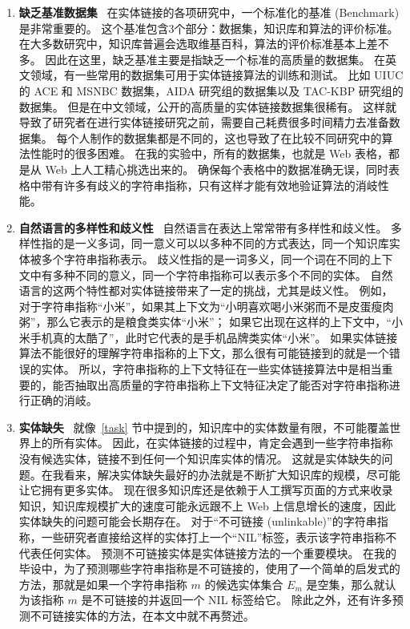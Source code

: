 \begin{enumerate}[1.]
\item \textbf{缺乏基准数据集} \ 
在实体链接的各项研究中，一个标准化的基准 (Benchmark) 是非常重要的。
这个基准包含3个部分：数据集，知识库和算法的评价标准。
在大多数研究中，知识库普遍会选取维基百科，算法的评价标准基本上差不多。
因此在这里，缺乏基准主要是指缺乏一个标准的高质量的数据集。
在英文领域，有一些常用的数据集可用于实体链接算法的训练和测试。
比如 UIUC 的 ACE 和 MSNBC 数据集，AIDA 研究组的数据集以及 TAC-KBP 研究组的数据集。
但是在中文领域，公开的高质量的实体链接数据集很稀有。
这样就导致了研究者在进行实体链接研究之前，需要自己耗费很多时间精力去准备数据集。
每个人制作的数据集都是不同的，这也导致了在比较不同研究中的算法性能时的很多困难。
在我的实验中，所有的数据集，也就是 Web 表格，都是从 Web 上人工精心挑选出来的。
确保每个表格中的数据准确无误，同时表格中带有许多有歧义的字符串指称，只有这样才能有效地验证算法的消岐性能。

\item \textbf{自然语言的多样性和歧义性} \ 
自然语言在表达上常常带有多样性和歧义性。
多样性指的是一义多词，同一意义可以以多种不同的方式表达，同一个知识库实体被多个字符串指称表示。
歧义性指的是一词多义，同一个词在不同的上下文中有多种不同的意义，同一个字符串指称可以表示多个不同的实体。
自然语言的这两个特性都对实体链接带来了一定的挑战，尤其是歧义性。
例如，对于字符串指称``小米''，如果其上下文为``小明喜欢喝小米粥而不是皮蛋瘦肉粥''，那么它表示的是粮食类实体``小米''；
如果它出现在这样的上下文中，``小米手机真的太酷了''，此时它代表的是手机品牌类实体``小米''。
如果实体链接算法不能很好的理解字符串指称的上下文，那么很有可能链接到的就是一个错误的实体。
所以，字符串指称的上下文特征在一些实体链接算法中是相当重要的，能否抽取出高质量的字符串指称上下文特征决定了能否对字符串指称进行正确的消岐。

\item \textbf{实体缺失} \ 
就像~\ref{task} 节中提到的，知识库中的实体数量有限，不可能覆盖世界上的所有实体。
因此，在实体链接的过程中，肯定会遇到一些字符串指称没有候选实体，链接不到任何一个知识库实体的情况。
这就是实体缺失的问题。在我看来，解决实体缺失最好的办法就是不断扩大知识库的规模，尽可能让它拥有更多实体。
现在很多知识库还是依赖于人工撰写页面的方式来收录知识，知识库规模扩大的速度可能永远跟不上 Web 上信息增长的速度，因此实体缺失的问题可能会长期存在。
对于``不可链接 (unlinkable)''的字符串指称，一些研究者\cite{wu2013zhishilink}\cite{dredze2010entity}直接给这样的实体打上一个``NIL''标签，表示该字符串指称不代表任何实体。
预测不可链接实体是实体链接方法的一个重要模块。
在我的毕设中，为了预测哪些字符串指称是不可链接的，使用了一个简单的启发式的方法，那就是如果一个字符串指称 $m$ 的候选实体集合 $E_m$ 是空集，那么就认为该指称 $m$ 是不可链接的并返回一个 NIL 标签给它。
除此之外，还有许多预测不可链接实体的方法，在本文中就不再赘述。


\end{enumerate}


